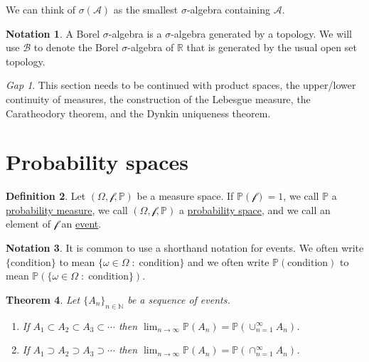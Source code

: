 \documentclass[11pt]{article}
\newcommand{\col}[1]{\mathscr{#1}}
\newcommand{\p}{\mathbb{P}}
\newcommand{\bor}{\col{B}}
\newcommand{\defname}[1]{\underline{#1}}
\newcommand{\NN}{\mathbb{N}}
\newcommand{\RR}{\mathbb{R}}
\theoremstyle{theorem}
\newtheorem{theorem}{Theorem}[section]
\theoremstyle{definition}
\newtheorem{definition}[theorem]{Definition}
\newtheorem{notation}[theorem]{Notation}
\theoremstyle{remark}
\theoremstyle{step}
\theoremstyle{gap}
\newtheorem*{gap}{Gap}
\begin{document}
We can think of \(\sigma(\col{A})\) as the smallest \(\sigma\)-algebra containing \(\col{A}\).

\begin{notation}
A Borel \(\sigma\)-algebra is a \(\sigma\)-algebra generated by a topology. We will use \(\bor\) to denote the Borel \(\sigma\)-algebra of \(\RR\) that is generated by the usual open set topology.
\end{notation}

\begin{gap} This section needs to be continued with product spaces, the upper/lower continuity of measures, the construction of the Lebesgue measure, the Caratheodory theorem, and the Dynkin uniqueness theorem.\end{gap}

\section{Probability spaces}

\begin{definition}
Let \((\Omega, \col{f}, \p)\) be a measure space. If \(\p(\col{f}) = 1\), we call \(\p\) a \defname{probability measure}, we call \((\Omega, \col{f}, \p)\) a \defname{probability space}, and we call an element of \(\col{f}\) an \defname{event}.
\end{definition}

\begin{notation}
It is common to use a shorthand notation for events. We often write \(\{\text{condition}\}\) to mean \(\{\omega \in \Omega\;:\;\text{condition}\}\) and we often write \(\p(\text{condition})\) to mean \(\p\left(\{\omega \in \Omega\;:\;\text{condition}\}\right)\).
\end{notation}

\begin{theorem}\label{thm.monotoneconvergence}
Let \(\{A_n\}_{n \in \NN}\) be a sequence of events.
\begin{enumerate}
\item
If \(A_1 \subset A_2 \subset A_3 \subset \cdots\) then \(\lim_{n \to \infty} \p(A_n) = \p\left(\cup_{n=1}^\infty A_n\right)\).
\item
If \(A_1 \supset A_2 \supset A_3 \supset \cdots\) then \(\lim_{n \to \infty} \p(A_n) = \p\left(\cap_{n=1}^\infty A_n\right)\).
\end{enumerate}
\end{theorem}
\end{document}
